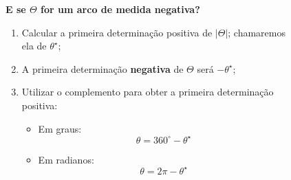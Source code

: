 \begin{frame}
  \begin{columns}[onlytextwidth]
    \begin{column}{0.49\textwidth}
      \begin{highlight}
        \textbf{E se $\Theta$ for um arco de medida negativa?}
        \vspace*{0.3cm}
        \begin{enumerate}
          \item Calcular a primeira determinação positiva de $|\Theta|$; chamaremos ela de $\theta^{\star}$;
          \item A primeira determinação \textbf{negativa} de $\Theta$ será $-\theta^{\star}$;
          \item Utilizar o complemento para obter a primeira determinação positiva:
          \begin{itemize}
            \item Em graus:
            \begin{equation*}
              \theta = 360^{\circ} - \theta^{\star}
            \end{equation*}
            \item Em radianos:
            \begin{equation*}
              \theta = 2\pi - \theta^{\star}
            \end{equation*}
          \end{itemize}
        \end{enumerate}
      \end{highlight}
    \end{column}
    \begin{column}{0.49\textwidth}
      \vspace*{-0.5cm}
      \begin{figure}
      \end{figure}
    \end{column}
  \end{columns}
\end{frame}

